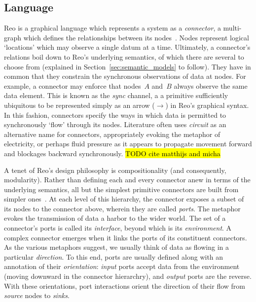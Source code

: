 \subsection{Language}
\label{sec:reo_lang}
Reo is a graphical language which represents a system as a \textit{connector}, a multi-graph which defines the relationships between its nodes~\cite{arbab2011puff}. Nodes represent logical `locations' which may observe a single datum at a time. Ultimately, a connector's relations boil down to Reo's underlying semantics, of which there are several to choose from (explained in Section~\ref{sec:semantic_models} to follow). They have in common that they constrain the synchronous observations of data at nodes. For example, a connector may enforce that nodes~$A$ and~$B$ always observe the same data element. This is known as the \textit{sync} channel, a a primitive sufficiently ubiquitous to be represented simply as an arrow ($\longrightarrow$) in Reo's graphical syntax. In this fashion, connectors specify the ways in which data is permitted to synchronously `flow' through its nodes. Literature often uses \textit{circuit} as an alternative name for connectors, appropriately evoking the metaphor of electricity, or perhaps fluid pressure as it appears to propagate movement forward and blockages backward synchronously.
\hl{TODO cite matthijs and micha} 

A tenet of Reo's design philosophy is compositionality (and consequently, modularity). Rather than defining each and every connector anew in terms of the underlying semantics, all but the simplest primitive connectors are built from simpler ones~\cite{arbab2011puff}. At each level of this hierarchy, the connector exposes a subset of its nodes to the connector above, wherein they are called \textit{ports}. The metaphor evokes the transmission of data a harbor to the wider world. The set of a connector's ports is called its \textit{interface}, beyond which is its \textit{environment}. A complex connector emerges when it links the ports of its constituent connectors. As the various metaphors suggest, we usually think of data as flowing in a particular \textit{direction}. To this end, ports are usually defined along with an annotation of their \textit{orientation}: \textit{input} ports accept data from the environment (moving downward in the connector hierarchry), and \textit{output} ports are the reverse. With these orientations, port interactions orient the direction of their flow from \textit{source} nodes to \textit{sinks}.

